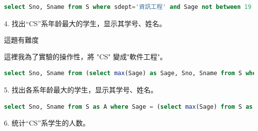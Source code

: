 \documentclass[12pt, a4paper]{report}
\begin{document}
\begin{lstlisting}[language=SQL]
    select Sno, Sname from S where sdept='資訊工程' and Sage not between 19 and 21;
\end{lstlisting}

\begin{figure}[H] %
    \centering %
\end{figure}
4. 找出“CS”系年龄最大的学生，显示其学号、姓名。

這題有難度

這裡我為了實驗的操作性，將 "CS" 變成"軟件工程"。\\

\begin{lstlisting}[language=SQL]
    select Sno, Sname from (select max(Sage) as Sage, Sno, Sname from S where sdept='軟件工程');
\end{lstlisting}

\begin{figure}[H] %
    \centering %
\end{figure}
5. 找出各系年龄最大的学生，显示其学号、姓名。\\

\begin{lstlisting}[language=SQL]
    select Sno, Sname from S as A where Sage = (select max(Sage) from S as B where A.Sdept = B.Sdept);
\end{lstlisting}

\begin{figure}[H] %
    \centering %
\end{figure}
6. 统计“CS”系学生的人数。\\
\end{document}
